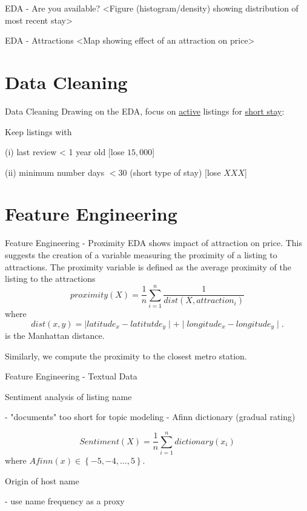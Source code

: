 \documentclass{beamer}
\begin{document}
\begin{frame}{EDA - Are you available?}
<Figure (histogram/density) showing distribution of most recent stay>
\end{frame}

\begin{frame}{EDA - Attractions}
<Map showing effect of an attraction on price>
\end{frame}


\section{Data Cleaning}

\begin{frame}{Data Cleaning}
Drawing on the EDA, focus on \underline{active} listings for \underline{short stay}:

Keep listings with

(i) last review < 1 year old [lose $15,000$]

(ii) minimum number days $< 30$ (short type of stay) [lose $XXX$]

\end{frame}


\section{Feature Engineering}
\begin{frame}{Feature Engineering - Proximity}
EDA shows impact of attraction on price. This suggests the creation of a variable measuring the proximity of a listing to attractions. The proximity variable is defined as the average proximity of the listing to the attractions
$$proximity(X) = \dfrac{1}{n}\sum_{i=1}^{n} \dfrac{1}{dist(X, attraction_i)}
$$
where
$$ 
dist(x, y) = \mid latitude_{x} - latitutde_{y} \mid +  \mid longitude_{x} - longitude_{y} \mid.
$$
is the Manhattan distance.

Similarly, we compute the proximity to the closest metro station.
\end{frame}

\begin{frame}{Feature Engineering - Textual Data}

Sentiment analysis of listing name

- "documents" too short for topic modeling
- Afinn dictionary (gradual rating)

$$ Sentiment(X) = \dfrac{1}{n}\sum_{i=1}^{n} dictionary(x_i)
$$
where $Afinn(x) \in \left\lbrace -5, -4, \dots, 5\right\rbrace $.

Origin of host name 

- use name frequency as a proxy

\end{frame}
\end{document}
